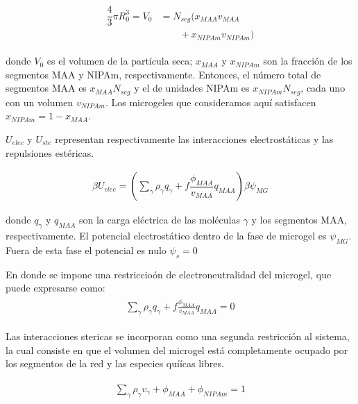 %
%
\begin{align}
	\begin{aligned} 
		\dfrac{4}{3}\pi R_0^3=V_0&=N_{seg}\Big( x_{MAA} v_{MAA}\\
		&\qquad+x_{NIPAm} v_{NIPAm}\Big)
	\end{aligned}
\end{align}


\noindent donde $V_0$ es el volumen de la part\'icula seca; $x_{MAA}$ y $x_{NIPAm}$ son la fracci\'on de los segmentos MAA y NIPAm, respectivamente.
Entonces, el n\'umero total de segmentos MAA es $x_{MAA}N_{seg}$ y el de unidades NIPAm es $x_{NIPAm}N_{seg}$, cada uno con un volumen $v_{NIPAm}$.
Los microgeles que consideramos aqu\'i satisfacen $x_{NIPAm}=1-x_{MAA}$.



$U_{elec}$ y $U_{ste}$ representan respectivamente las interacciones electrost\'aticas y las repulsiones est\'ericas.

\begin{align}
	  \beta U_{elec} =\left(\sum_{\gamma } {\rho_\gamma q_\gamma + f\dfrac{\phi_{MAA}}{v_{MAA}}q_{MAA}}\right)\beta\psi_{MG}
\end{align}

\noindent donde $q_\gamma$ y $q_{MAA}$ son la carga el\'ectrica de las moléculas $\gamma$ y los segmentos MAA, respectivamente.
El potencial electrost\'atico dentro de la fase de microgel es $\psi_{MG}$. Fuera de esta fase el potencial es nulo $\psi_s = 0$

En donde se impone una restriccio\'on de electroneutralidad del microgel, que puede expresarse como:
%
%
\begin{align}
	\begin{aligned}
		\sum_{\gamma  } \rho_\gamma q_\gamma + f\frac{\phi_{MAA}}{v_{MAA}}q_{MAA}=0
	\end{aligned}
	\label{eq:gel:charge-neutrality}
\end{align}

Las interacciones stericas se incorporan como una segunda restricci\'on al sistema, la cual consiste en que  el volumen del microgel est\'a completamente ocupado por los segmentos de la red y las especies quí\'icas libres.

%
\begin{align}
	\begin{aligned}
		\sum_{\gamma } \rho_\gamma v_\gamma  + \phi_{MAA} + \phi_{NIPAm} = 1
	\end{aligned}
	\label{eq:gel:packing}
\end{align}



